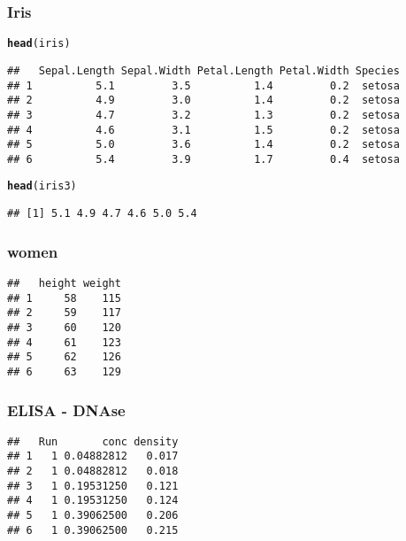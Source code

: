 \documentclass[a4paper,10pt]{book}\usepackage[]{graphicx}\usepackage[]{color}
\makeatletter
\newcommand{\hlstd}[1]{\textcolor[rgb]{0.345,0.345,0.345}{#1}}%
\newcommand{\hlkwd}[1]{\textcolor[rgb]{0.737,0.353,0.396}{\textbf{#1}}}%
\newenvironment{kframe}{%
 \def\at@end@of@kframe{}%
 \ifinner\ifhmode%
  \def\at@end@of@kframe{\end{minipage}}%
  \begin{minipage}{\columnwidth}%
 \fi\fi%
 \def\FrameCommand##1{\hskip\@totalleftmargin \hskip-\fboxsep
 \colorbox{shadecolor}{##1}\hskip-\fboxsep
     \hskip-\linewidth \hskip-\@totalleftmargin \hskip\columnwidth}%
 \MakeFramed {\advance\hsize-\width
   \@totalleftmargin\z@ \linewidth\hsize
   \@setminipage}}%
 {\par\unskip\endMakeFramed%
 \at@end@of@kframe}
\newenvironment{knitrout}{}{} %
\makeatother
\begin{document}
\subsubsection{Iris}

\begin{knitrout}
\color{fgcolor}\begin{kframe}
\begin{alltt}
\hlkwd{head}\hlstd{(iris)}
\end{alltt}
\begin{verbatim}
##   Sepal.Length Sepal.Width Petal.Length Petal.Width Species
## 1          5.1         3.5          1.4         0.2  setosa
## 2          4.9         3.0          1.4         0.2  setosa
## 3          4.7         3.2          1.3         0.2  setosa
## 4          4.6         3.1          1.5         0.2  setosa
## 5          5.0         3.6          1.4         0.2  setosa
## 6          5.4         3.9          1.7         0.4  setosa
\end{verbatim}
\begin{alltt}
\hlkwd{head}\hlstd{(iris3)}
\end{alltt}
\begin{verbatim}
## [1] 5.1 4.9 4.7 4.6 5.0 5.4
\end{verbatim}
\end{kframe}
\end{knitrout}

\subsubsection*{women}

\begin{knitrout}
\color{fgcolor}\begin{kframe}
\begin{verbatim}
##   height weight
## 1     58    115
## 2     59    117
## 3     60    120
## 4     61    123
## 5     62    126
## 6     63    129
\end{verbatim}
\end{kframe}
\end{knitrout}

\subsubsection*{ELISA - DNAse}

\begin{knitrout}
\color{fgcolor}\begin{kframe}
\begin{verbatim}
##   Run       conc density
## 1   1 0.04882812   0.017
## 2   1 0.04882812   0.018
## 3   1 0.19531250   0.121
## 4   1 0.19531250   0.124
## 5   1 0.39062500   0.206
## 6   1 0.39062500   0.215
\end{verbatim}
\end{kframe}
\end{knitrout}
\end{document}
